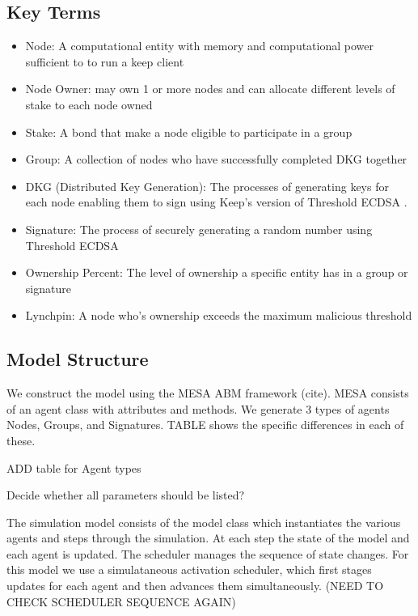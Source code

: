 \documentclass[conference]{IEEEtran}
\begin{document}
\subsection{Key Terms}
\begin{itemize}
\item Node: A computational entity with memory and computational power sufficient to to run a 
keep client
    
\item Node Owner: may own 1 or more nodes and can allocate different levels of stake to each node
    owned
    
\item Stake: A bond that make a node eligible to participate in a group 
    
\item Group: A collection of nodes who have successfully completed DKG together
    
\item DKG (Distributed Key Generation): The processes of generating keys for each node enabling
    them to sign using Keep's version of Threshold ECDSA \cite{Gennaro2018}.
    
\item Signature: The process of securely generating a random number using Threshold ECDSA \cite{Gennaro2018}
    
\item Ownership Percent: The level of ownership a specific entity has in a group or signature
    
\item Lynchpin: A node who's ownership exceeds the maximum malicious threshold
\end{itemize}

\subsection{Model Structure}
We construct the model using the MESA ABM framework (cite). MESA consists of an agent class with
attributes and methods. We generate 3 types of agents Nodes, Groups, and Signatures. TABLE shows 
the specific differences in each of these.

ADD table for Agent types


Decide whether all parameters should be listed?


The simulation model consists of the model class which instantiates the various agents
and steps through the simulation. At each step the state of the model and each agent
is updated. The scheduler manages the sequence of state changes. For this model we use
a simulataneous activation scheduler, which first stages updates for each agent and then 
advances them simultaneously.  (NEED TO CHECK SCHEDULER SEQUENCE AGAIN)
\end{document}
